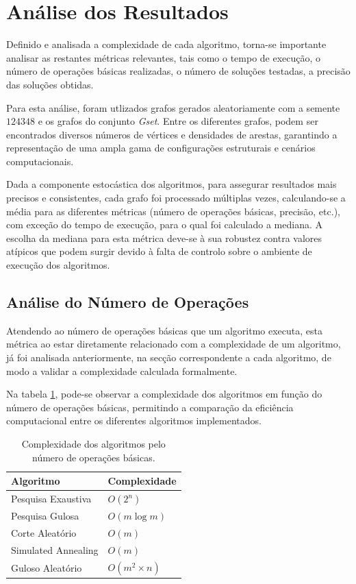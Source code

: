 \documentclass[mirror, portugues]{revdetua}
\begin{document}
\section{Análise dos Resultados}

Definido e analisada a complexidade de cada algoritmo, torna-se importante analisar as restantes métricas relevantes, tais como o tempo de execução, o número de operações básicas realizadas, o número de soluções testadas, a precisão das soluções obtidas.

Para esta análise, foram utlizados grafos gerados aleatoriamente com a semente $124348$ e os grafos do conjunto \textit{Gset}. Entre os diferentes grafos, podem ser encontrados diversos números de vértices e densidades de arestas, garantindo a representação de uma ampla gama de configurações estruturais e cenários computacionais.

Dada a componente estocástica dos algoritmos, para assegurar resultados mais precisos e consistentes, cada grafo foi processado múltiplas vezes, calculando-se a média para as diferentes métricas (número de operações básicas, precisão, etc.), com exceção do tempo de execução, para o qual foi calculado a mediana. A escolha da mediana para esta métrica deve-se à sua robustez contra valores atípicos que podem surgir devido à falta de controlo sobre o ambiente de execução dos algoritmos.


\subsection{Análise do Número de Operações}

Atendendo ao número de operações básicas que um algoritmo executa, esta métrica ao estar diretamente relacionado com a complexidade de um algoritmo, já foi analisada anteriormente, na secção correspondente a cada algoritmo, de modo a validar a complexidade calculada formalmente.

Na tabela \ref{table:numops}, pode-se observar a complexidade dos algoritmos em função do número de operações básicas, permitindo a comparação da eficiência computacional entre os diferentes algoritmos implementados.

\begin{table}[H]
\centering
\caption{Complexidade dos algoritmos pelo número de operações básicas.}
\label{table:numops}
\begin{tabular}{ll}
\toprule
\textbf{Algoritmo} & \textbf{Complexidade} \\
\midrule
Pesquisa Exaustiva & $O(2^n)$ \\
Pesquisa Gulosa & $O(m \log m)$ \\
Corte Aleatório & $O(m)$ \\
Simulated Annealing & $O(m)$ \\
Guloso Aleatório & $O(m^2 \times n)$ \\
\bottomrule
\end{tabular}
\end{table}
\end{document}
